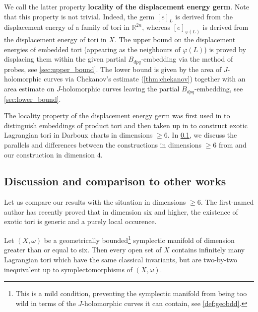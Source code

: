 \documentclass[12pt,a4paper,abstract=true,draft]{scrartcl}
\begin{document}
We call the latter property \textbf{locality of the displacement energy germ}.
Note that this property is not trivial.
Indeed, the germ $[e]_L$ is derived from the displacement energy of a family of tori in $\mathbb{R}^{2n}$, whereas $[e]_{\varphi(L)}$ is derived from the displacement energy of tori in $X$.
The upper bound on the displacement energies of embedded tori (appearing as the neighbours of $\varphi(L)$) is proved by displacing them within the given partial $B_{dpq}$-embedding via the method of probes, see \cref{sec:upper_bound}.
The lower bound is given by the area of $J$-holomorphic curves via Chekanov's estimate (\cref{thm:chekanov}) together with an area estimate on $J$-holomorphic curves leaving the partial $B_{dpq}$-embedding, see \cref{sec:lower_bound}.

The locality property of the displacement energy germ was first used in \cite{chekanovschlenk2015} to distinguish embeddings of product tori and then taken up in \cite{brendel2023local} to construct exotic Lagrangian tori in Darboux charts in dimensions $\geqslant 6$.
In \cref{into:discussion}, we discuss the parallels and differences between the constructions in dimensions $\geqslant 6$ from \cite{brendel2023local} and our construction in dimension $4$. 

\subsection{Discussion and comparison to other works}
\label{into:discussion}

Let us compare our results with the situation in dimensions $\geqslant 6$.
The first-named author has recently proved that in dimension six and higher, the existence of exotic tori is generic and a purely local occurence. 
\begin{theorem}\cite[Theorem D]{brendel2023local}
    \label{thm:Bre23}
    Let $(X,\omega)$ be a geometrically bounded\footnote{This is a mild condition, preventing the symplectic manifold from being too wild in terms of the $J$-holomorphic curves it can contain, see \cref{def:geobdd}.} symplectic manifold of dimension greater than or equal to six.
Then every open set of $X$ contains infinitely many Lagrangian tori which have the same classical invariants, but are two-by-two inequivalent up to symplectomorphisms of $(X,\omega)$.
\end{theorem}
\end{document}
